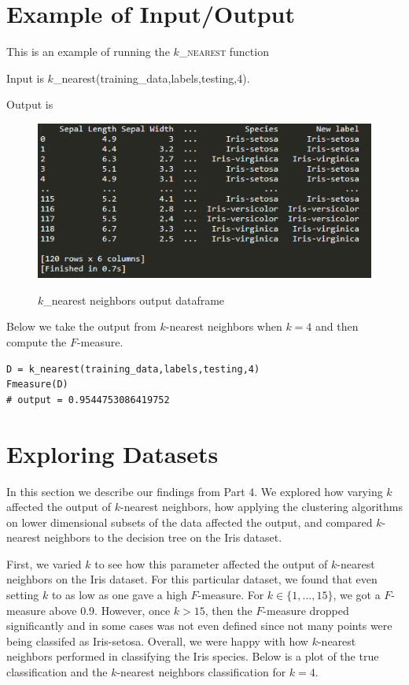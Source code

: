 \documentclass[psamsfonts,onesided,10pt]{amsart}
\begin{document}
\section{Example of Input/Output}
\begin{description}
\item[$k$-Nearest Neighbors] This is an example of running the \textsc{$k$\_nearest} function
	\item Input is $k$\_nearest(training_data,labels,testing,4).
	\item Output is
	\begin{figure}[H]
    	\centering
    	{\includegraphics[width=.4\textwidth]{images/knearest.png}} 
   	 \caption{$k$\_nearest neighbors output dataframe}
\end{figure}
	

\item[Decision Tree] \todo{}

\item[$k$ Fold Cross Validation] \todo{}

\item[$F$-measure] Below we take the output from $k$-nearest neighbors when $k=4$ and then compute the $F$-measure. 
\begin{verbatim}
D = k_nearest(training_data,labels,testing,4)
Fmeasure(D)
# output = 0.9544753086419752
\end{verbatim}
\end{description}

\section{Exploring Datasets}
In this section we describe our findings from Part 4. We explored how varying $k$ affected the 
output of $k$-nearest neighbors, how applying the clustering algorithms on lower dimensional 
subsets of the data affected the output, and compared $k$-nearest neighbors to the decision 
tree on the Iris dataset. 

First, we varied $k$ to see how this parameter affected the output of $k$-nearest neighbors on 
the Iris dataset. For this particular dataset, we found that even setting $k$ to as low as one gave 
a high $F$-measure. For $k\in \{1,...,15\}$, we got a $F$-measure above 0.9. However, 
once $k>15$, then the $F$-measure dropped significantly and in some cases was not even 
defined since not many points were being classifed as Iris-setosa. Overall, we were happy with 
how $k$-nearest neighbors performed in classifying the Iris species. Below is a plot of the true 
classification and the $k$-nearest neighbors classification for $k=4$. 
\end{document}
